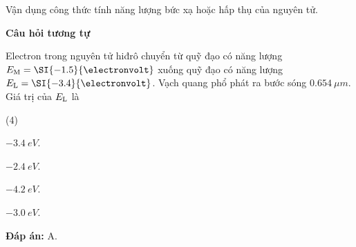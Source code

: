 \begin{dang}{Vận dụng công thức tính năng lượng bức xạ hoặc hấp thụ của nguyên tử.}
{		\begin{center}
			\textbf{Câu hỏi tương tự}
		\end{center}
		
		Electron trong nguyên tử hiđrô chuyển từ quỹ đạo có năng lượng $E_\text M = \SI{-1.5}{\electronvolt}$ xuống quỹ đạo có năng lượng $E_\text L = \SI{-3.4}{\electronvolt}$. Vạch quang phổ phát ra bước sóng $ \SI{0,654}{\mu m} $. Giá trị của $ E_\text L $ là
		\begin{mcq}(4)
			\item $ \SI{-3,4}{eV} $.
			\item $ \SI{-2,4}{eV} $.
			\item $ \SI{-4,2}{eV} $.
			\item $ \SI{-3,0}{eV} $.
		\end{mcq}
		
		\textbf{Đáp án:} A.
	}
\end{dang}

